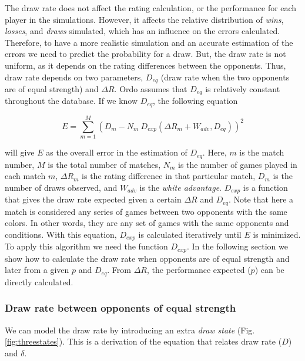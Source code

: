 \documentclass[12pt]{article}
\begin{document}
The draw rate does not affect the rating calculation, or the performance for each player in the simulations.
However, it affects the relative distribution of \textit{wins}, \textit{losses}, and \textit{draws} simulated, which has an influence on the errors calculated. 
Therefore, to have a more realistic simulation and an accurate estimation of the errors we need to predict the probability for a draw.
But, the draw rate is not uniform, as it depends on the rating differences between the opponents.
Thus, draw rate depends on two parameters, $D_{eq}$ (draw rate when the two opponents are of equal strength) and $\Delta R$.
Ordo assumes that $D_{eq}$ is relatively constant throughout the database.
If we know $D_{eq}$, the following equation

	\begin{equation} \label{eq:draw_rate_errors}
	E = \sum\limits_{m=1}^M (D_{m} - N_{m}\: D_{exp}(\Delta R_{m} + W_{adv}, D_{eq}))^2
	\end{equation}

will give $E$ as the overall error in the estimation of $D_{eq}$. 
Here, $m$ is the match number, $M$ is the total number of matches, $N_{m}$ is the number of games played in each match $m$, $\Delta R_{m}$ is the rating difference in that particular match, $D_{m}$ is the number of draws observed, and $W_{adv}$ is the \textit{white advantage}.
$D_{exp}$ is a function that gives the draw rate expected given a certain $\Delta R$ and $D_{eq}$. 
Note that here a match is considered any series of games between two opponents with the same colors. 
In other words, they are any set of games with the same opponents and conditions.
With this equation, $D_{exp}$ is calculated iteratively until $E$ is minimized. 
To apply this algorithm we need the function $D_{exp}$. 
In the following section we show how to calculate the draw rate when opponents are of equal strength and later from a given $p$ and $D_{eq}$.
From $\Delta R$, the performance expected ($p$) can be directly calculated.


\subsubsection*{Draw rate between opponents of equal strength}

We can model the draw rate by introducing an extra \textit{draw state} (Fig. \ref{fig:threestates}). 
This is a derivation of the equation that relates draw rate ($D$) and $\delta$.
\end{document}
